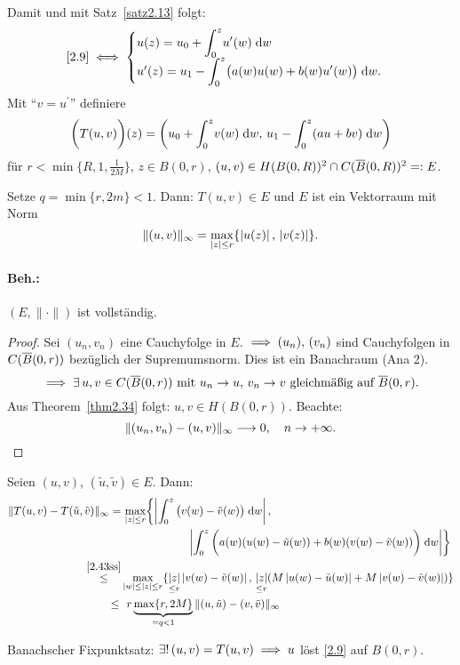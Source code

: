 \documentclass[a4paper,twoside,DIV15,BCOR12mm]{scrbook}
\begin{document}
\begin{bsp}
Damit und mit Satz~\ref{satz2.13} folgt:
\[\eqref{2.9}\iff\begin{cases}u(z)=u_0+\displaystyle\int_{0}^{z}{\!u^\prime(w)}\;\mathrm{d} w\\u^\prime(z)=u_1-\displaystyle\int_{0}^{z}{\!\bigl(a(w)u(w)+b(w)u^\prime(w)\bigr)}\;\mathrm{d} w.\end{cases}\]
Mit ``$v=u^\prime$'' definiere
\[\biggl(T(u,v)\biggr)(z)=\biggl(u_0+\int_{0}^{z}{\!v(w)}\;\mathrm{d} w,\, u_1-\int_{0}^{z}{\!(au+bv)}\;\mathrm{d} w\biggr)\]
für $r<\min\{R,1,\frac{1}{2M}\}$, $z\in B(0,r)$, $(u,v)\in H(B(0,R))^2\cap C(\overline{B}(0,R))^2=: E$.

Setze $q=\min\{r,2m\}<1$. Dann: $T(u,v)\in E$ und $E$ ist ein Vektorraum mit Norm
\[\|(u,v)\|_\infty=\max_{\left\lvert z\right\lvert\leq r}\{\left\lvert u(z)\right\lvert,\,\left\lvert v(z)\right\lvert\}.\]

\vspace*{-20pt}\paragraph{Beh.:} $(E,\|\cdot\|)$ ist vollständig.
\begin{proof} Sei $(u_n,v_n)$ eine Cauchyfolge in $E$. $\implies (u_n),\,(v_n)$ sind Cauchyfolgen in $C(\overline{B}(0,r))$ bezüglich der Supremumsnorm. Dies ist ein Banachraum (Ana 2).
\[\implies\exists\, u,v\in C(\overline{B}(0,r))\text{ mit }u_n\to u,\,v_n\to v\text{ gleichmäßig auf }\overline{B}(0,r).\]
Aus Theorem~\ref{thm2.34} folgt: $u,v\in H(B(0,r))$. Beachte:
\[\|(u_n,v_n)-(u,v)\|_\infty\longrightarrow 0,\quad n\to +\infty.\qedhere\]
\end{proof}

Seien $(u,v)$, $(\tilde{u},\tilde{v})\in E$. Dann:
\begin{align*}
\|T(u,v)-T(\tilde{u},\tilde{v})\|_\infty=&\,\max_{\left\lvert z\right\lvert\leq r}\biggl\{\left\lvert\int_{0}^{z}{\bigl(v(w)-\tilde{v}(w)\bigr)}\;\mathrm{d} w\right\lvert,\\
&\qquad\qquad\qquad\left\lvert\int_{0}^{z}{\biggl(a(w)(u(w)-\tilde{u}(w))+b(w)(v(w)-\tilde{v}(w))\biggr)}\;\mathrm{d} w\right\lvert\biggr\}\\
\overset{\eqref{2.43ss}}{\leq}&\max_{\left\lvert w\right\lvert\leq\left\lvert z\right\lvert\leq r}\{\underset{\leq r}{\left\lvert z\right\lvert}\left\lvert v(w)-\tilde{v}(w)\right\lvert,\,\underset{\leq r}{\left\lvert z\right\lvert}(M\left\lvert u(w)-\tilde{u}(w)\right\lvert+M\left\lvert v(w)-\tilde{v}(w)\right\lvert)\}\\
\leq\, &\:\;r\underbrace{\max\{r,2M\}}_{=q<1}\|(u,\tilde{u})-(v,\tilde{v})\|_\infty
\end{align*}

Banachscher Fixpunktsatz: $\exists!\,(u,v)=T(u,v)\implies u$ löst \eqref{2.9} auf $B(0,r)$.


\end{bsp}
\end{document}
